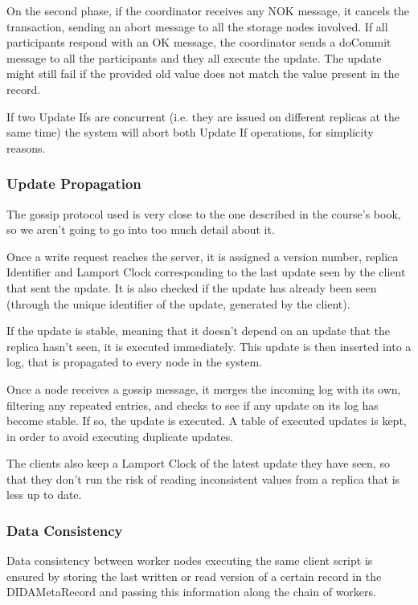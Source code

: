 \documentclass[times, 10pt,twocolumn]{article}
\begin{document}
On the second phase, if the coordinator receives any NOK message, it cancels the transaction, sending an abort message to all the storage nodes involved.
If all participants respond with an OK message, the coordinator sends a doCommit message to all the participants and they all execute the update. The update might still fail if the provided old value
does not match the value present in the record.

If two Update Ifs are concurrent (i.e. they are issued on different replicas at the same time) the system will abort both Update If operations, for simplicity reasons.

\subsubsection{Update Propagation}

The gossip protocol used is very close to the one described in the course's book, so we aren't going to go into too much detail about it.

Once a write request reaches the server, it is assigned a version number, replica Identifier and Lamport Clock corresponding to the last update seen by the client that sent the update.
It is also checked if the update has already been seen (through the unique identifier of the update, generated by the client).

If the update is stable, meaning that it doesn't depend on an update that the replica hasn't seen, it is executed immediately. 
This update is then inserted into a log, that is propagated to every node in the system.

Once a node receives a gossip message, it merges the incoming log with its own, filtering any repeated entries, and checks to 
see if any update on its log has become stable. If so, the update is executed.
A table of executed updates is kept, in order to avoid executing duplicate updates.

The clients also keep a Lamport Clock of the latest update they have seen, so that they don't run the risk of reading inconsistent values from a replica that is less up to date.


\subsubsection{Data Consistency}

Data consistency between worker nodes executing the same client script is ensured by storing the last written or read version of a certain record 
in the DIDAMetaRecord and passing this information along the chain of workers.
\end{document}
